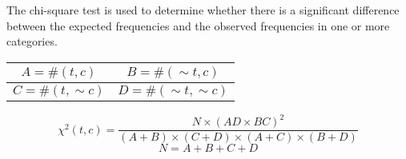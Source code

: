 \begin{multicols*}{2}
\noindent The chi-square test is used to determine whether there is a significant difference between the expected frequencies and the observed frequencies in one or more categories. 

\begin{center}
\begin{tabular}{ |c|c| } 
    \hline
    $A = \#(t,c)$ & $B = \#(\sim t,c)$ \\
    \hline 
    $C = \#(t,\sim c)$ & $D = \#(\sim t,\sim c)$ \\
    \hline
\end{tabular}
\end{center}

$$\chi^2(t,c) = \frac{N\times (AD \times BC)^2}{(A+B) \times (C+D) \times (A+C) \times (B+D)}$$
$$N=A+B+C+D$$

\end{multicols*}
